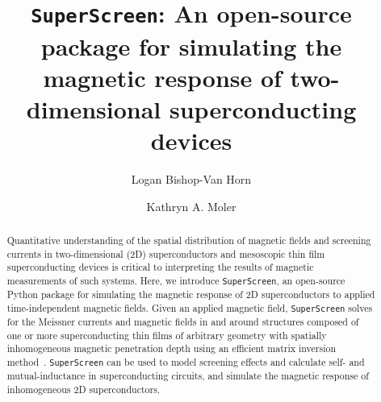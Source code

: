 \documentclass[final,3p,times]{elsarticle}
\newcommand{\inline}[1]{\texttt{#1}\xspace}
\newcommand{\SuperScreen}{\inline{SuperScreen}}
\begin{document}
\begin{frontmatter}



\title{\texttt{SuperScreen}: An open-source package for simulating the magnetic response of two-dimensional superconducting devices}


\author[PHYS,SIMES]{Logan Bishop-Van Horn}
\author[AP,SIMES,GLAM]{Kathryn A. Moler}


\address[PHYS]{Department of Physics, Stanford University, Stanford, California 94305, USA}
\address[AP]{Department of Applied Physics, Stanford University, Stanford, California 94305, USA}
\address[SIMES]{Stanford Institute for Materials and Energy Sciences, SLAC National Accelerator Laboratory, 2575 Sand Hill Road, Menlo Park, California 94025, USA}
\address[GLAM]{Geballe Laboratory for Advanced Materials, Stanford University, Stanford, California 94305, USA}

\begin{abstract}
Quantitative understanding of the spatial distribution of magnetic fields and screening currents in two-dimensional (2D) superconductors and mesoscopic thin film superconducting devices is critical to interpreting the results of magnetic measurements of such systems. Here, we introduce \SuperScreen, an open-source Python package for simulating the magnetic response of 2D superconductors to applied time-independent magnetic fields. Given an applied magnetic field, \SuperScreen solves for the Meissner currents and magnetic fields in and around structures composed of one or more superconducting thin films of arbitrary geometry with spatially inhomogeneous magnetic penetration depth using an efficient matrix inversion method~\cite{Brandt2004-ew, Brandt2005-wj}. \SuperScreen can be used to model screening effects and calculate self- and mutual-inductance in superconducting circuits, and simulate the magnetic response of inhomogeneous 2D superconductors.
\end{abstract}


\end{frontmatter}
\end{document}
